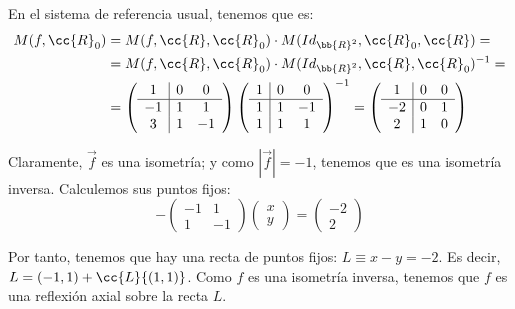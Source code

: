 \begin{ejercicio}
    En el sistema de referencia usual, tenemos que es:
    \begin{equation*}
        \begin{split}
            M(f, \cc{R}_0) &= M(f, \cc{R}, \cc{R}_0) \cdot M(Id_{\bb{R}^2}, \cc{R}_0, \cc{R}) =\\
            &= M(f, \cc{R}, \cc{R}_0) \cdot M(Id_{\bb{R}^2}, \cc{R}, \cc{R}_0)^{-1} =\\
            &=\left(\begin{array}{c|cc}
                1 & 0 & 0 \\ \hline
                -1 & 1 & 1 \\
                3 & 1 & -1
            \end{array}\right)
            \left(\begin{array}{c|cc}
                1 & 0 & 0 \\ \hline
                1 & 1 & -1 \\
                1 & 1 & 1
            \end{array}\right)^{-1}
            = \left(\begin{array}{c|cc}
                1 & 0 & 0 \\ \hline
                -2 & 0 & 1 \\
                2 & 1 & 0
            \end{array}\right)
        \end{split}
    \end{equation*}

    Claramente, $\vec{f}$ es una isometría; y como $\left|\vec{f}\right| = -1$, tenemos que es una isometría inversa. Calculemos sus puntos fijos:
    \begin{equation*}
        -\left(\begin{array}{cc}
            -1 & 1 \\
            1 & -1
        \end{array}\right)
        \left(\begin{array}{c}
            x\\y
        \end{array}\right) = 
        \left(\begin{array}{c}
            -2\\2
        \end{array}\right)
    \end{equation*}

    Por tanto, tenemos que hay una recta de puntos fijos: $L\equiv x-y=-2$. Es decir, $L = (-1,1) + \cc{L}\{(1,1)\}$. Como $f$ es una isometría inversa, tenemos que $f$ es una reflexión axial sobre la recta $L$.
\end{ejercicio}


